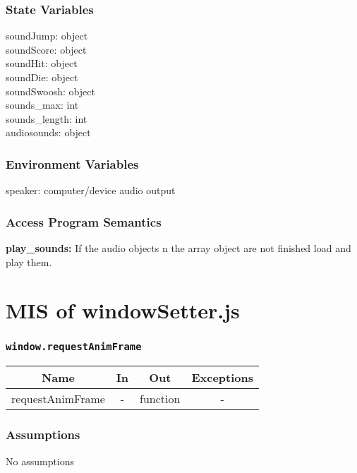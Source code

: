 \documentclass[11pt, oneside]{article}   	%
\begin{document}
\subsubsection*{State Variables}
soundJump: object\\
soundScore: object\\
soundHit: object\\
soundDie: object\\
soundSwoosh: object\\
sounds\_max: int\\
sounds\_length: int\\
audiosounds: object\\
\subsubsection*{Environment Variables}
speaker: computer/device audio output

\subsubsection*{Access Program Semantics} 
 \textbf{play\_sounds:} If the audio objects n the array object are not finished load and play them.
 
 
 
 

\section*{MIS of windowSetter.js}
\subsubsection*{\texttt{window.requestAnimFrame}}



\begin{center}
\begin{tabular}{ |c|c|c|c| } 
 \hline
 Name & In & Out & Exceptions \\ 
 \hline \hline
 requestAnimFrame & - & function & - \\ 
 \hline
\end{tabular}
\end{center}

\subsubsection*{Assumptions}
No assumptions
\end{document}
